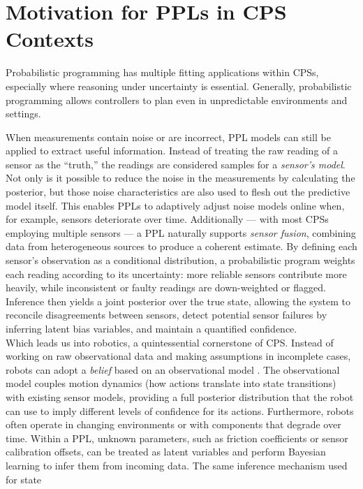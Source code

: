 \documentclass[11pt]{report}
\begin{document}
\section{Motivation for PPLs in CPS Contexts}

Probabilistic programming has multiple fitting applications within CPSs, especially where reasoning under uncertainty is essential. Generally, probabilistic programming
allows controllers to plan even in unpredictable environments and settings.

\begin{multicols}{2}
When measurements contain noise or are incorrect, PPL models can still be applied to extract useful information. Instead of treating the raw reading of a sensor as the “truth,”
the readings are considered samples for a \textit{sensor’s model}. Not only is it possible to reduce the noise in the measurements by calculating the posterior, 
but those noise characteristics are also used to flesh out the predictive model itself.
This enables PPLs to adaptively adjust noise models online when, for example, sensors deteriorate over time.
Additionally — with most CPSs employing multiple sensors — a PPL naturally supports \textit{sensor fusion}, \cite{cpsSensorFusion} combining data from heterogeneous sources
to produce a coherent estimate. By defining each sensor's observation as a conditional distribution, a probabilistic program
weights each reading according to its uncertainty: more reliable sensors contribute more heavily, while inconsistent or faulty readings are down-weighted or flagged. 
Inference then yields a joint posterior over the true state, allowing the system to reconcile disagreements between sensors, detect potential sensor failures by inferring 
latent bias variables, and maintain a quantified confidence.
\\
Which leads us into robotics, a quintessential cornerstone of CPS. Instead of working on raw observational data and making assumptions in incomplete cases, robots can adopt 
a \textit{belief} based on an observational model \cite{cpsProbabilisticRobotics}. The observational model couples motion dynamics (how actions translate into state 
transitions) with existing sensor models, providing a full posterior distribution that the robot can use to imply different levels of confidence for its actions.
Furthermore, robots often operate in changing environments or with components that degrade over time. Within a PPL, unknown parameters, such as friction 
coefficients or sensor calibration offsets, can be treated as latent variables and perform Bayesian learning to infer them from incoming data. The same inference mechanism used for state 

\end{multicols}
\end{document}
